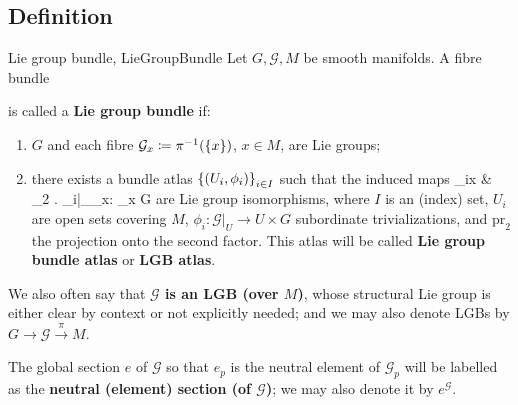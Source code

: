 \documentclass[a4paper,oneside,11pt,bibliography=totoc]{scrartcl}
\def\bas#1\eas{\begin{align*}#1\end{align*}}
\theoremstyle{plain}
\theoremstyle{remark}
\theoremstyle{definition}
\begin{document}
\subsection{Definition}
\begin{definitions}{Lie group bundle, \cite[\S 1.1, Def.\ 1.1.19; p. 11]{mackenzieGeneralTheory}}{LieGroupBundle}
Let $G, \mathcal{G}, M$ be smooth manifolds. A fibre bundle
\begin{center}
\end{center}
is called a \textbf{Lie group bundle} if:
\begin{enumerate}
	\item $G$ and each fibre $\mathcal{G}_x \coloneqq \pi^{-1}\mleft( \{x\} \mright)$, $x\in M$, are Lie groups;
	\item there exists a bundle atlas $\mleft\{ \mleft( U_i, \phi_i \mright) \mright\}_{i \in I}$ such that the induced maps
	\bas
	\phi_{ix}
	&\coloneqq
	_2 \circ \mleft. \phi_i\mright|_{_x}: _x \to G
	\eas
	are Lie group isomorphisms, where $I$ is an (index) set, $U_i$ are open sets covering $M$, $\phi_i: \mathcal{G}|_U \to U \times G$ subordinate trivializations, and $\mathrm{pr}_2$ the projection onto the second factor. This atlas will be called \textbf{Lie group bundle atlas} or \textbf{LGB atlas}.
\end{enumerate}

We also often say that \textbf{$\mathcal{G}$ is an LGB (over $M$)}, whose structural Lie group is either clear by context or not explicitly needed; and we may also denote LGBs by $G \to \mathcal{G} \stackrel{\pi}{\to} M$.

The global section $e$ of $\mathcal{G}$ so that $e_p$ is the neutral element of $\mathcal{G}_p$ will be labelled as the \textbf{neutral (element) section (of $\mathcal{G}$)}; we may also denote it by $e^{\mathcal{G}}$.
\end{definitions}
\end{document}
